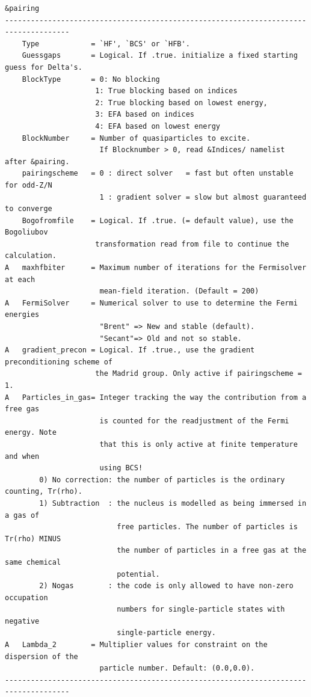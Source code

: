 \documentclass[print,amsmath,amssymb,aps,prc,nofootinbib,notitlepage]{revtex4-1}
\begin{document}
\begin{Verbatim}
&pairing
-------------------------------------------------------------------------------------
    Type            = `HF', `BCS' or `HFB'.
    Guessgaps       = Logical. If .true. initialize a fixed starting guess for Delta's.
    BlockType       = 0: No blocking 
                     1: True blocking based on indices
                     2: True blocking based on lowest energy, 
                     3: EFA based on indices
                     4: EFA based on lowest energy
    BlockNumber     = Number of quasiparticles to excite.
                      If Blocknumber > 0, read &Indices/ namelist after &pairing.
    pairingscheme   = 0 : direct solver   = fast but often unstable for odd-Z/N
                      1 : gradient solver = slow but almost guaranteed to converge
    Bogofromfile    = Logical. If .true. (= default value), use the Bogoliubov
                     transformation read from file to continue the calculation.           
A   maxhfbiter      = Maximum number of iterations for the Fermisolver at each
                      mean-field iteration. (Default = 200)                                  
A   FermiSolver     = Numerical solver to use to determine the Fermi energies
                      "Brent" => New and stable (default).
                      "Secant"=> Old and not so stable.                                         
A   gradient_precon = Logical. If .true., use the gradient preconditioning scheme of 
                     the Madrid group. Only active if pairingscheme = 1.
A   Particles_in_gas= Integer tracking the way the contribution from a free gas 
                      is counted for the readjustment of the Fermi energy. Note
                      that this is only active at finite temperature and when
                      using BCS!
        0) No correction: the number of particles is the ordinary counting, Tr(rho).
        1) Subtraction  : the nucleus is modelled as being immersed in a gas of 
                          free particles. The number of particles is Tr(rho) MINUS 
                          the number of particles in a free gas at the same chemical 
                          potential.
        2) Nogas        : the code is only allowed to have non-zero occupation 
                          numbers for single-particle states with negative 
                          single-particle energy.
A   Lambda_2        = Multiplier values for constraint on the dispersion of the 
                      particle number. Default: (0.0,0.0).
-------------------------------------------------------------------------------------
\end{Verbatim}
\end{document}
